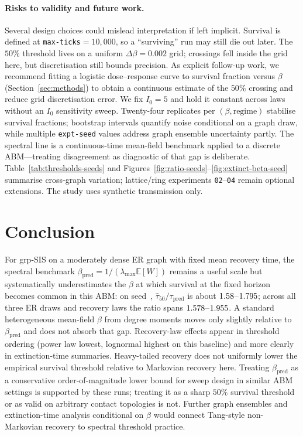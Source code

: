 \documentclass[11pt,a4paper]{article}
\begin{document}
\paragraph{Risks to validity and future work.}
Several design choices could mislead interpretation if left implicit. Survival is defined at \texttt{max-ticks}${}=10{,}000$, so a ``surviving'' run may still die out later. The $50\%$ threshold lives on a uniform $\Delta\beta=0.002$ grid; crossings fell inside the grid here, but discretisation still bounds precision. As explicit follow-up work, we recommend fitting a logistic dose--response curve to survival fraction versus $\beta$ (Section~\ref{sec:methods}) to obtain a continuous estimate of the $50\%$ crossing and reduce grid discretisation error. We fix $I_0{=}5$ and hold it constant across laws without an $I_0$ sensitivity sweep. Twenty-four replicates per $(\beta,\text{regime})$ stabilise survival fractions; bootstrap intervals quantify noise conditional on a graph draw, while multiple \texttt{expt-seed} values address graph ensemble uncertainty partly. The spectral line is a continuous-time mean-field benchmark applied to a discrete ABM---treating disagreement as diagnostic of that gap is deliberate. Table~\ref{tab:thresholds-seeds} and Figures~\ref{fig:ratio-seeds}--\ref{fig:extinct-beta-seed} summarise cross-graph variation; lattice/ring experiments \texttt{02}--\texttt{04} remain optional extensions. The study uses synthetic transmission only.

\section{Conclusion}
\label{sec:conclusion}

For grp-SIS on a moderately dense ER graph with fixed mean recovery time, the spectral benchmark $\beta_{\mathrm{pred}}=1/(\lambda_{\max}\mathbb{E}[W])$ remains a useful scale but systematically underestimates the $\beta$ at which survival at the fixed horizon becomes common in this ABM: on seed~\RepPrimarySeed{}, $\hat{\tau}_{50}/\tau_{\mathrm{pred}}$ is about $1.58$--$1.795$; across all three ER draws and recovery laws the ratio spans $1.578$--$1.955$. A standard heterogeneous mean-field $\beta$ from degree moments moves only slightly relative to $\beta_{\mathrm{pred}}$ and does not absorb that gap. Recovery-law effects appear in threshold ordering (power law lowest, lognormal highest on this baseline) and more clearly in extinction-time summaries. Heavy-tailed recovery does not uniformly lower the empirical survival threshold relative to Markovian recovery here. Treating $\beta_{\mathrm{pred}}$ as a conservative order-of-magnitude lower bound for sweep design in similar ABM settings is supported by these runs; treating it as a sharp $50\%$ survival threshold or as valid on arbitrary contact topologies is not. Further graph ensembles and extinction-time analysis conditional on $\beta$ would connect Tang-style non-Markovian recovery to spectral threshold practice.
\end{document}
